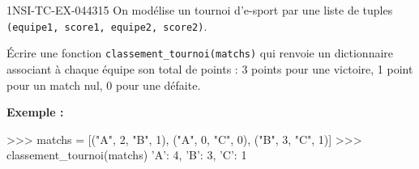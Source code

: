 \begin{exercice}{1NSI-TC-EX-044}{3}{15}
On modélise un tournoi d'e-sport par une liste de tuples
\lstinline{(equipe1, score1, equipe2, score2)}.

Écrire une fonction \lstinline{classement_tournoi(matchs)} qui renvoie un
dictionnaire associant à chaque équipe son total de points : 3 points pour une
victoire, 1 point pour un match nul, 0 pour une défaite.

\textbf{Exemple :}
\begin{console}
>>> matchs = [("A", 2, "B", 1), ("A", 0, "C", 0), ("B", 3, "C", 1)]
>>> classement_tournoi(matchs)
{'A': 4, 'B': 3, 'C': 1}
\end{console}
\end{exercice}
